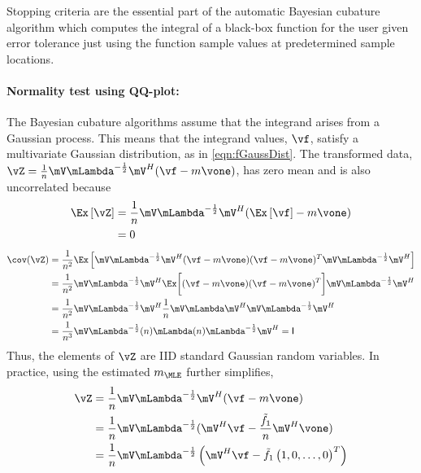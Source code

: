 Stopping criteria are the essential part of the automatic Bayesian cubature algorithm which computes the integral of a black-box function for the user given error tolerance just using the function sample values at predetermined sample locations.



\paragraph{Normality test using QQ-plot:}
The Bayesian cubature algorithms assume that the integrand arises from a Gaussian process. This means that the integrand values, $\vf$, satisfy a multivariate Gaussian distribution, as in \eqref{eqn:fGaussDist}.  The transformed data, $\vZ = \frac 1n \mV \mLambda^{-\frac 12} \mV^H(\vf - m \vone)$, has zero mean and is also uncorrelated because
\begin{align*}
\Ex\left[\vZ \right] &= 
\frac 1n \mV \mLambda^{-\frac 12} \mV^H(\Ex\left[\vf\right] - m \vone) 
\\
& = 0
\end{align*}
\begin{align*}
\cov (\vZ) 
&= \frac {1}{n^2} \Ex\left[  
\mV \mLambda^{-\frac 12} \mV^H (\vf - m \vone)
(\vf - m \vone)^T \mV \mLambda^{-\frac 12} \mV^H
\right]
\\
&=
\frac {1}{n^2} \mV \mLambda^{-\frac 12} \mV^H 
\Ex \biggl[ (\vf - m \vone)
(\vf - m \vone)^T \biggr] \mV \mLambda^{-\frac 12} \mV^H
\\ %
&=
\frac{1}{n^2} \mV \mLambda^{-\frac 12} \mV^H 
\frac 1n \mV \mLambda \mV^H \mV \mLambda^{-\frac 12} \mV^H
\\
&=
\frac{1}{n^3} \mV \mLambda^{-\frac 12} (n) \mLambda (n) \mLambda^{-\frac 12} \mV^H
= \mathsf{I}
\end{align*}
Thus, the elements of $\vZ$ are IID standard Gaussian random variables.  
In practice, using the estimated $m_\MLE$ further simplifies, 
\begin{align}
\nonumber
\vZ &= \frac 1n \mV \mLambda^{-\frac 12} \mV^H(\vf - m \vone) \\
\nonumber
 &= \frac 1n \mV \mLambda^{-\frac 12} (\mV^H \vf - \frac{\tilde{f}_1}{n} \mV^H \vone) 
\\
\label{eqn:normalize}
 &= \frac 1n \mV \mLambda^{-\frac 12} \left(\mV^H \vf - \tilde{f}_1 \begin{pmatrix}1, 0, \hdots, 0 \end{pmatrix}^T \right) 
\end{align}

